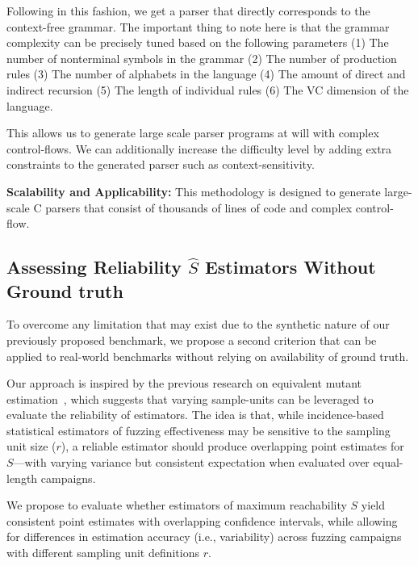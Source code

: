 \documentclass[conference]{IEEEtran}
\begin{document}
Following in this fashion, we get a parser that directly corresponds to the context-free
grammar. The important thing to note here is that the grammar complexity can be
precisely tuned based on the following parameters
(1) The number of nonterminal symbols in the grammar
(2) The number of production rules
(3) The number of alphabets in the language
(4) The amount of direct and indirect recursion
(5) The length of individual rules
(6) The VC dimension of the language.

This allows us to generate large scale parser programs at will with complex control-flows. We can
additionally increase the difficulty level by adding extra constraints to the generated parser such
as context-sensitivity.

\noindent\textbf{Scalability and Applicability:} This methodology is designed to generate large-scale C parsers that consist of thousands of lines of code and complex control-flow.

\subsection{Assessing Reliability \texorpdfstring{$\hat{S}$}{S-hat} Estimators Without Ground truth}
To overcome any limitation that may exist due to the synthetic nature of our
previously proposed benchmark, we propose a second criterion that can be applied
to real-world benchmarks without relying on availability of ground truth.

Our approach is inspired by the previous research on equivalent mutant
estimation~\cite{Kuznetsov2024empirical}, which suggests that varying
sample-units can be leveraged to evaluate the reliability of estimators.
The idea is that, while incidence-based statistical estimators of
fuzzing effectiveness may be sensitive to the sampling unit size ($r$),
a reliable estimator should produce overlapping point estimates for $S$—with
varying variance but consistent expectation when evaluated over equal-length
campaigns.

We propose to evaluate whether estimators of maximum reachability $S$ yield
consistent point estimates with overlapping confidence intervals, while allowing
for differences in estimation accuracy (i.e., variability) across fuzzing
campaigns with different sampling unit definitions $r$.


% 
\end{document}
